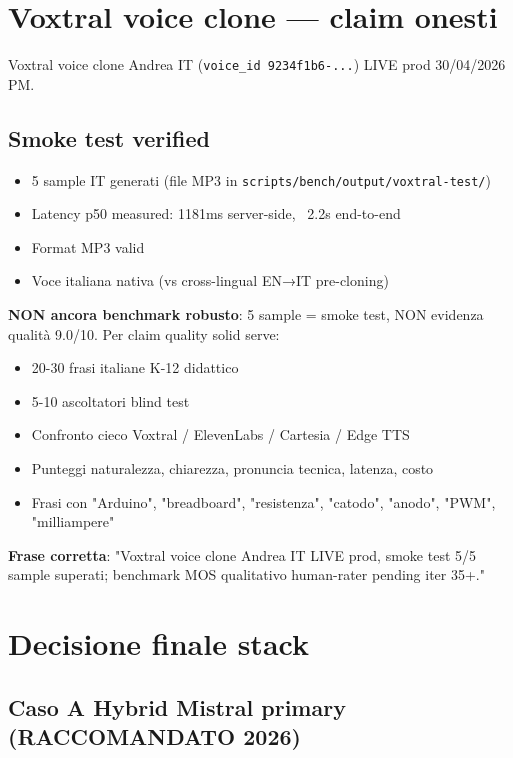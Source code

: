 \documentclass[12pt,a4paper]{article}
\begin{document}
\section{Voxtral voice clone --- claim onesti}

Voxtral voice clone Andrea IT (\texttt{voice\_id 9234f1b6-...}) LIVE prod 30/04/2026 PM.

\subsection*{Smoke test verified}

\begin{itemize}[leftmargin=*]
  \item 5 sample IT generati (file MP3 in \texttt{scripts/bench/output/voxtral-test/})
  \item Latency p50 measured: 1181ms server-side, ~2.2s end-to-end
  \item Format MP3 valid
  \item Voce italiana nativa (vs cross-lingual EN→IT pre-cloning)
\end{itemize}

\textbf{NON ancora benchmark robusto}: 5 sample = smoke test, NON evidenza qualità 9.0/10. Per claim quality solid serve:
\begin{itemize}[leftmargin=*]
  \item 20-30 frasi italiane K-12 didattico
  \item 5-10 ascoltatori blind test
  \item Confronto cieco Voxtral / ElevenLabs / Cartesia / Edge TTS
  \item Punteggi naturalezza, chiarezza, pronuncia tecnica, latenza, costo
  \item Frasi con "Arduino", "breadboard", "resistenza", "catodo", "anodo", "PWM", "milliampere"
\end{itemize}

\textbf{Frase corretta}: "Voxtral voice clone Andrea IT LIVE prod, smoke test 5/5 sample superati; benchmark MOS qualitativo human-rater pending iter 35+."

\section{Decisione finale stack}

\subsection*{Caso A Hybrid Mistral primary (RACCOMANDATO 2026)}
\end{document}
